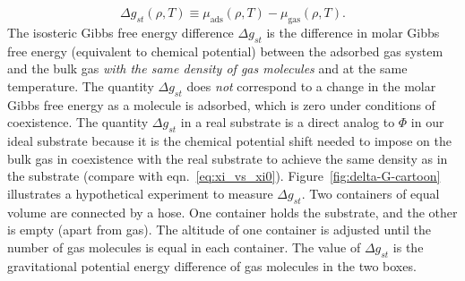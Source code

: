 \documentclass[pre,twocolumn]{revtex4-2}
\newcommand\V{\Phi}
\newcommand\gst{\ensuremath{\Delta g_{st}}}
\newcommand{\blue}[1]{{\bf \color{blue} #1}}
\newcommand{\davidsays}[1]{{\color{red} [\blue{D:} \emph{#1}]}}
\newcommand{\corysays}[1]{{\color{red} [\blue{Cory:} \emph{#1}]}}
\begin{document}
\begin{equation}
   \gst(\rho, T) \equiv
    \mu_{\text{ads}}(\rho, T) - \mu_{\text{gas}}(\rho, T).
  \label{eq:g_st}
\end{equation}
The isosteric Gibbs free energy difference $\gst$ is the difference in molar
Gibbs free energy (equivalent to chemical potential) between the adsorbed gas system and
the bulk gas \emph{with the same density of gas molecules} and at the same temperature. The quantity $\gst$
does \emph{not} correspond to a change in the molar Gibbs free energy as a
molecule is adsorbed, which is zero under conditions of coexistence. The
quantity $\gst$ in a real substrate is a direct analog to $\V$ in our ideal
substrate because it is the chemical potential shift needed to impose on the
bulk gas in coexistence with the real substrate to achieve the same density as
in the substrate (compare with eqn.~\ref{eq:xi_vs_xi0}).
%
%
Figure~\ref{fig:delta-G-cartoon} illustrates a hypothetical experiment to
measure $\gst$.  Two containers of equal volume are connected by a hose.  One
container holds the substrate, and the other is empty (apart from gas).    The
altitude of one container is adjusted until the number of gas molecules is equal
in each container.  The value of $\gst$ is the gravitational potential energy
difference of gas molecules in the two boxes.
\end{document}
